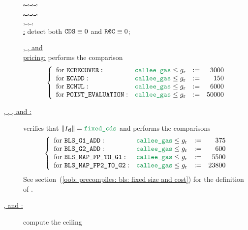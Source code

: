 \begin{description}
		\item[]
			\underline{\instEcrecover{}, \instShaTwo{}, \instRipemd{}, \instIdentity{},}\\
			\underline{\instEcadd{}, \instEcmul{}, \instEcpairing{}, \instPointEvaluation{},}\\
			\underline{\instBlsGOneAdd{}, \instBlsGTwoAdd{}, \instBlsMapFpToGOne{},}\\
			\underline{\instBlsMapFpTwoToGTwo{}:}
			detect both $\texttt{CDS} \equiv 0$ and $\texttt{R@C} \equiv 0$;
		\item[]
			\underline{\instEcrecover{}, \instEcadd{}, \instEcmul{} and}\\
			\underline{\instPointEvaluation{} pricing:}
			performs the comparison
		\[
			\left\{ \begin{array}{llcrcl}
				\text{for }\instEcrecover{}       : & \locCalleeGas \leq g_\text{r} & := &  3000 \\
				\text{for }\instEcadd{}           : & \locCalleeGas \leq g_\text{r} & := &   150 \\
				\text{for }\instEcmul{}           : & \locCalleeGas \leq g_\text{r} & := &  6000 \\
				\text{for }\instPointEvaluation{} : & \locCalleeGas \leq g_\text{r} & := & 50000 \\
			\end{array} \right.
		\]
	\item[\underline{\instBlsGOneAdd{},
		\instBlsGTwoAdd{},
		\instBlsMapFpToGOne{}, and
		\instBlsMapFpTwoToGTwo{}:}]
		verifies that $\| I_\textbf{d} \| = \locFixedCds$ and performs the comparisons
		\[
			\left\{ \begin{array}{llcrcl}
				\text{for }\instBlsGOneAdd{}        : & \locCalleeGas \leq g_\text{r} & := &   375 \\
				\text{for }\instBlsGTwoAdd{}        : & \locCalleeGas \leq g_\text{r} & := &   600 \\
				\text{for }\instBlsMapFpToGOne{}    : & \locCalleeGas \leq g_\text{r} & := &  5500 \\
				\text{for }\instBlsMapFpTwoToGTwo{} : & \locCalleeGas \leq g_\text{r} & := & 23800 \\
			\end{array} \right.
		\]
		See section~(\ref{oob: precompiles: bls: fixed size and cost}) for the definition of \locFixedCds{}.	
	\item[\underline{\instShaTwo{},
		\instRipemd{} and
		\instIdentity{}:}]
		compute the ceiling

\end{description}
